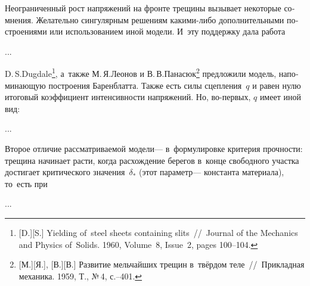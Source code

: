 


\begin{otherlanguage}{russian}

Неограниченный рост напряжений на фронте трещины вызывает некоторые сомнения. Желательно  сингулярным решениям какими\hbox{-}либо дополнительными построениями или использованием иной модели. И~эту поддержку дала работа

...



\end{otherlanguage}



\begin{otherlanguage}{russian}

D.\,S.\;Dugdale\footnote{[D.][S.] Yielding of~steel sheets containing slits~//~Journal of the Mechanics and Physics of~Solids. 1960, Volume~8, Issue~2, pages 100\hbox{--}104.
}\hspace{-0.4ex}, а~также М.\,Я.\;Леонов и В.\,В.\;Панасюк\footnote{[М.][Я.], [В.][В.] Развитие мельчайших трещин в~твёрдом теле~//~Прикладная механика. 1959, Т., №\,4, с.\hbox{--}401.} предложили модель, напоминающую построения Баренблатта. Также есть силы сцепления~$q$ и равен нулю итоговый коэффициент интенсивности напряжений. Но, во\hbox{-}первых, $q$ имеет иной вид:

...

Второе отличие рассматриваемой модели\:--- в~формулировке критерия прочности: трещина начинает расти, когда расхождение берегов в~конце свободного участка достигает критического значения~$\delta_{*}$ (этот параметр\:--- константа материала), то~есть при

...



\end{otherlanguage}

